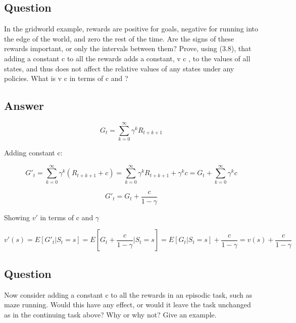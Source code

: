 \documentclass[11pt]{article}
\begin{document}
    \subsection{Question}

    In the gridworld example, rewards are positive for goals, negative for running into the edge of the world, and zero the rest of the time.
    Are the signs of these rewards important, or only the intervals between them?
    Prove, using (3.8), that adding a constant c to all the rewards adds a constant, v c , to the values of all states, and thus does not affect the relative values of any states under any policies.
    What is v c in terms of c and ?

    \subsection*{Answer}

    \begin{equation}
        G_{t} = \sum_{k=0}^{\infty} \gamma^{k} R_{t+k+1}
    \end{equation}

    Adding constant c:

    \begin{equation}
        G'_{t} = \sum_{k=0}^{\infty} \gamma^{k} (R_{t+k+1} + c) = \sum_{k=0}^{\infty} \gamma^{k} R_{t+k+1} + \gamma^{k} c = G_{t} +  \sum_{k=0}^{\infty} \gamma^{k} c
    \end{equation}

    \begin{equation}
        G'_{t} =  G_{t} + \frac{c}{1-\gamma}
    \end{equation}

    Showing $v'$ in terms of c and $\gamma$

    \begin{equation}
        v'(s) =  E[G'_{t}|S_{t}=s] = E[G_{t} + \frac{c}{1-\gamma}|S_{t}=s] = E[G_{t}|S_{t}=s] + \frac{c}{1-\gamma} = v(s) + \frac{c}{1-\gamma}
    \end{equation}

    \subsection{Question}

    Now consider adding a constant c to all the rewards in an episodic task, such as maze running.
    Would this have any effect, or would it leave the task unchanged as in the continuing task above?
    Why or why not?
    Give an example.
\end{document}
